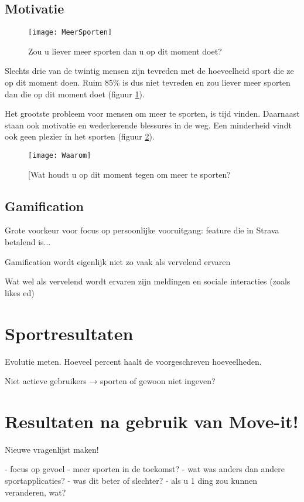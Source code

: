 \subsection{Motivatie}

\begin{figure}[h]
    \caption[Zou u liever meer sporten dan u op dit moment doet?]{Zou u liever meer sporten dan u op dit moment doet?}
    \texttt{[image: MeerSporten]}
    \label{fig:meerBewegen}
\end{figure}

Slechts drie van de twintig mensen zijn tevreden met de hoeveelheid sport die ze op dit moment doen. Ruim 85\% is dus niet tevreden en zou liever meer sporten dan die op dit moment doet (figuur \ref{fig:meerBewegen}).

Het grootste probleem voor mensen om meer te sporten, is tijd vinden. Daarnaast staan ook motivatie en wederkerende blessures in de weg. Een minderheid vindt ook geen plezier in het sporten (figuur \ref{fig:waarom}).

\begin{figure}[h]
    \caption[Wat houdt u op dit moment tegen om meer te sporten?]{[Wat houdt u op dit moment tegen om meer te sporten?}
    \texttt{[image: Waarom]}
    \label{fig:waarom}
\end{figure}

\subsection{Gamification}

Grote voorkeur voor focus op persoonlijke vooruitgang: feature die in Strava betalend is...

Gamification wordt eigenlijk niet zo vaak als vervelend ervaren

Wat wel als vervelend wordt ervaren zijn meldingen en sociale interacties (zoals likes ed)

\section{Sportresultaten}

Evolutie meten. Hoeveel percent haalt de voorgeschreven hoeveelheden.

Niet actieve gebruikers → sporten of gewoon niet ingeven?

\section{Resultaten na gebruik van Move-it!}

Nieuwe vragenlijst maken!

- focus op gevoel
- meer sporten in de toekomst?
- wat was anders dan andere sportapplicaties?
    - was dit beter of slechter?
- als u 1 ding zou kunnen veranderen, wat?